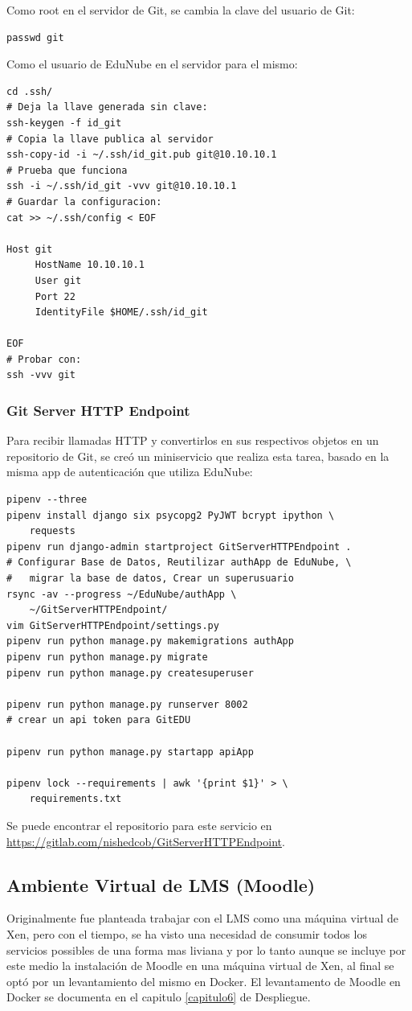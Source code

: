Como root en el servidor de Git, se cambia la clave del usuario de Git:
\begin{lstlisting}
passwd git
\end{lstlisting}

Como el usuario de EduNube en el servidor para el mismo:
\begin{lstlisting}
cd .ssh/
# Deja la llave generada sin clave:
ssh-keygen -f id_git
# Copia la llave publica al servidor
ssh-copy-id -i ~/.ssh/id_git.pub git@10.10.10.1
# Prueba que funciona
ssh -i ~/.ssh/id_git -vvv git@10.10.10.1
# Guardar la configuracion:
cat >> ~/.ssh/config < EOF

Host git
     HostName 10.10.10.1
     User git
     Port 22
     IdentityFile $HOME/.ssh/id_git

EOF
# Probar con:
ssh -vvv git
\end{lstlisting}

 
\subsubsection{Git Server HTTP Endpoint}
Para recibir llamadas HTTP y convertirlos en sus respectivos objetos en un repositorio de Git, se creó un miniservicio que realiza esta tarea, basado en la misma app de autenticación que utiliza EduNube:
\begin{lstlisting}
pipenv --three
pipenv install django six psycopg2 PyJWT bcrypt ipython \
	requests
pipenv run django-admin startproject GitServerHTTPEndpoint .
# Configurar Base de Datos, Reutilizar authApp de EduNube, \
#	migrar la base de datos, Crear un superusuario
rsync -av --progress ~/EduNube/authApp \
	~/GitServerHTTPEndpoint/
vim GitServerHTTPEndpoint/settings.py
pipenv run python manage.py makemigrations authApp
pipenv run python manage.py migrate
pipenv run python manage.py createsuperuser

pipenv run python manage.py runserver 8002
# crear un api token para GitEDU

pipenv run python manage.py startapp apiApp

pipenv lock --requirements | awk '{print $1}' > \
	requirements.txt
\end{lstlisting}

Se puede encontrar el repositorio para este servicio en \url{https://gitlab.com/nishedcob/GitServerHTTPEndpoint}.

 
\subsection{Ambiente Virtual de LMS  (Moodle)}
\label{instalacion-moodle}
Originalmente fue planteada trabajar con el LMS como una máquina virtual de Xen, pero con el tiempo, se ha visto una necesidad de consumir todos los servicios possibles de una forma mas liviana y por lo tanto aunque se incluye por este medio la instalación de Moodle en una máquina virtual de Xen, al final se optó por un levantamiento del mismo en Docker. El levantamento de Moodle en Docker se documenta en el capitulo \ref{capitulo6} de Despliegue.

